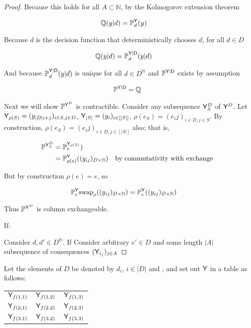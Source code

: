 \begin{proof}
Because this holds for all $A\subset\mathbb{N}$, by the Kolmogorov extension theorem

\begin{align}
    \mathbb{Q}(y|d) &= \mathbb{P}_d^{\mathsf{Y}}(y)
\end{align}

Because $d$ is the decision function that deterministically chooses $d$, for all $d\in D$

\begin{align}
    \mathbb{Q}(y|d) &= \mathbb{P}_d^{\mathsf{Y}|\mathsf{D}}(y|d)
\end{align}

And because $\mathbb{P}_d^{\mathsf{Y}|\mathsf{D}}(y|d)$ is unique for all $d\in D^{\mathbb{N}}$ and $\mathbb{P}^{\mathsf{Y}|\mathsf{D}}$ exists by assumption

\begin{align}
    \mathbb{P}^{\mathsf{Y}|\mathsf{D}}=\mathbb{Q}
\end{align}

Next we will show $\mathbb{P}^{\mathsf{Y}^D}$ is contractible. Consider any subsequence $\mathsf{Y}^D_S$ of $\mathsf{Y}^D$. Let $\mathsf{Y}_{\rho(S)} = (y_{|D|i+j})_{i\in S,j\in D}$, $\mathsf{Y}_{|S|}=(y_i)_{i\in [|S|]}$, $\rho(e_S)=(e_ij)_{i\in D,j\in S}$. By construction, $\rho(e_S)=(e_ij)_{i\in D,j\in [|S|]}$ also; that is, 

\begin{align}
    \mathbb{P}^{\mathsf{Y}^D_S}&= \mathbb{P}_e^{\mathsf{Y}_{\rho(S)}})\\
    &= \mathbb{P}_{\rho(e)}^{\mathsf{Y}}((y_{ij})_{D\times \mathbb{N}})&\text{by commutativity with exchange}
\end{align}

But by construction $\rho(e) = e$, so 

\begin{align}
    \mathbb{P}_e^{\mathsf{Y}}\text{swap}_{\rho} ((y_{ij})_{D\times \mathbb{N}}) &= \mathbb{P}_{e}^{\mathsf{Y}}((y_{ij})_{D\times \mathbb{N}})
\end{align}

Thus $\mathbb{P}^{\mathsf{Y}^D}$ is column exchangeable.


If:

Consider $d,d'\in D^{\mathbb{N}}$. If 
Consider arbitrary $e'\in D$ and some length $|A|$ subsequence of consequences $(\mathsf{Y}_{i_j})_{j\in A}$
\end{proof}

Let the elements of $D$ be denoted by $d_i$, $i\in |D|$ and , and set out $\mathsf{Y}$ in a table as follows:

\begin{center}
\begin{tabular}{ c c c }
 $\mathsf{Y}_{f(1,1)}$ & $\mathsf{Y}_{f(1,2)}$ & $\mathsf{Y}_{f(1,3)}$ \\ 
 $\mathsf{Y}_{f(2,1)}$ & $\mathsf{Y}_{f(2,2)}$ & $\mathsf{Y}_{f(2,3)}$ \\  
 $\mathsf{Y}_{f(3,1)}$ & $\mathsf{Y}_{f(3,2)}$ & $\mathsf{Y}_{f(3,3)}$    
\end{tabular}
\end{center}



